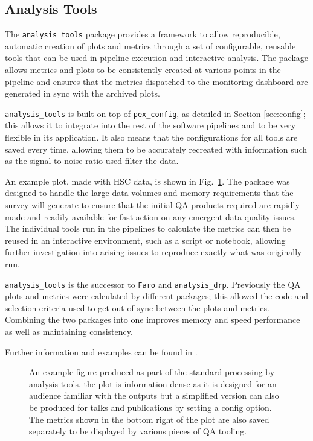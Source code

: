 \subsection{Analysis Tools}

The \texttt{analysis\_tools} package provides a framework to allow reproducible, automatic creation of plots and metrics through a set of configurable, reusable tools that can be used in pipeline execution and interactive analysis.
The package allows metrics and plots to be consistently created at various points in the pipeline and ensures that the metrics dispatched to the monitoring dashboard are generated in sync with the archived plots.

\texttt{analysis\_tools} is built on top of \texttt{pex\_config}, as detailed in Section \ref{sec:config}; this allows it to integrate into the rest of the software pipelines and to be very flexible in its application.
It also means that the configurations for all tools are saved every time, allowing them to be accurately recreated with information such as the signal to noise ratio used filter the data.

An example plot, made with HSC data, is shown in Fig.~\ref{fig:atools}.
The package was designed to handle the large data volumes and memory requirements that the survey will generate to ensure that the initial QA products required are rapidly made and readily available for fast action on any emergent data quality issues.
The individual tools run in the pipelines to calculate the metrics can then be reused in an interactive environment, such as a script or notebook, allowing further investigation into arising issues to reproduce exactly what was originally run.

\texttt{analysis\_tools} is the successor to \texttt{Faro} \citet{2022SPIE12189E..0MG} and \texttt{analysis\_drp}.
Previously the QA plots and metrics were calculated by different packages; this allowed the code and selection criteria used to get out of sync between the plots and metrics.
Combining the two packages into one improves memory and speed performance as well as maintaining consistency.

Further information and examples can be found in \citet{DMTN-314}.

\begin{figure}[h]
\caption{An example figure produced as part of the standard processing by analysis tools, the plot is information dense as it is designed for an audience familiar with the outputs but a simplified version can also be produced for talks and publications by setting a config option.
The metrics shown in the bottom right of the plot are also saved separately to be displayed by various pieces of QA tooling.}
\label{fig:atools}
\end{figure}
